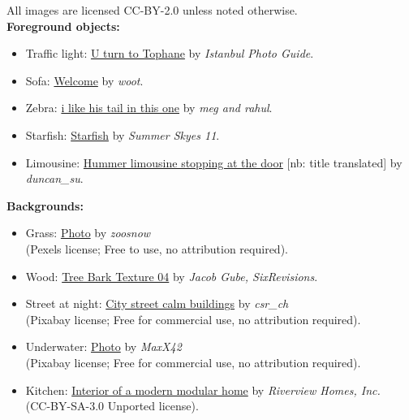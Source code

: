 \documentclass[runningheads]{llncs}
\begin{document}
\noindent All images are licensed CC-BY-2.0 unless noted otherwise.
\\ 

\noindent\textbf{Foreground objects:}
\begin{itemize}
   \item Traffic light: \href{https://farm3.staticflickr.com/3640/3576366805_eea15333d5_o.jpg}{U  turn to Tophane} by \emph{Istanbul Photo Guide}.
\item Sofa: \href{https://c8.staticflickr.com/4/3950/15557668485_5f23ed2ed3_o.jpg}{Welcome} by \emph{woot}.
\item Zebra: \href{https://farm8.staticflickr.com/3421/3367111780_dbfaf01821_o.jpg}{i like his tail in this one} by \emph{meg and rahul}.
\item Starfish: \href{https://c6.staticflickr.com/3/2936/14692943464_f618fc1360_o.jpg}{Starfish} by \emph{Summer Skyes 11}.
\item Limousine: \href{https://c7.staticflickr.com/5/4062/4271344866_1cb1a03cff_o.jpg}{Hummer limousine stopping at the door} [nb: title translated] by \emph{duncan\_su}. \end{itemize}

\noindent\textbf{Backgrounds:}
\begin{itemize}
    \item Grass: \href{https://www.pexels.com/photo/nature-field-grass-lawn-2637456/}{Photo} by \emph{zoosnow}\\
    (Pexels license; Free to use, no attribution required).
    \item Wood: \href{https://www.flickr.com/photos/31288116@N02/3752674533/sizes/l}{Tree Bark Texture 04} by \emph{Jacob Gube, SixRevisions}.
    \item Street at night: \href{https://pixabay.com/photos/city-street-calm-buildings-3875530/}{City street calm buildings} by \emph{csr\_ch}\\
    (Pixabay license; Free for commercial use, no attribution required).
    \item Underwater: \href{https://pixabay.com/ru/photos/\%D1\%80\%D0\%B0\%D0\%B7\%D0\%BB\%D0\%B8\%D1\%87\%D0\%BD\%D1\%8B\%D0\%B9-\%D1\%80\%D0\%B8\%D1\%84-\%D0\%B4\%D0\%B0\%D0\%B9\%D0\%B2\%D0\%B8\%D0\%BD\%D0\%B3-\%D0\%BA\%D0\%BE\%D1\%80\%D0\%B0\%D0\%BB\%D0\%BB-1198559/}{Photo} by \emph{MaxX42}\\ 
    (Pixabay license; Free for commercial use, no attribution required).
    \item Kitchen: \href{https://it.wikipedia.org/wiki/File:Modular_Kitchen.jpg}{Interior of a modern modular home} by \emph{Riverview Homes, Inc.}\\ 
    (CC-BY-SA-3.0 Unported license).
\end{itemize} 
\end{document}
